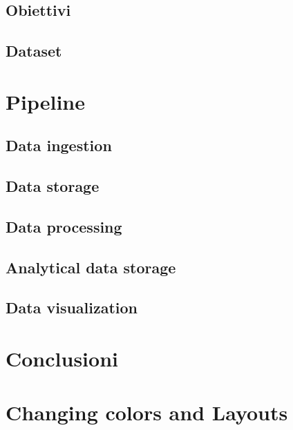 \documentclass[13pt,aspectratio=169,t,xcolor=table]{beamer}
\begin{document}
\subsection{Obiettivi}
\subsection{Dataset}

\section{Pipeline}
\subsection{Data ingestion}
\subsection{Data storage}
\subsection{Data processing}
\subsection{Analytical data storage}
\subsection{Data visualization}

\section{Conclusioni}


\section{Changing colors and Layouts}

\end{document}
